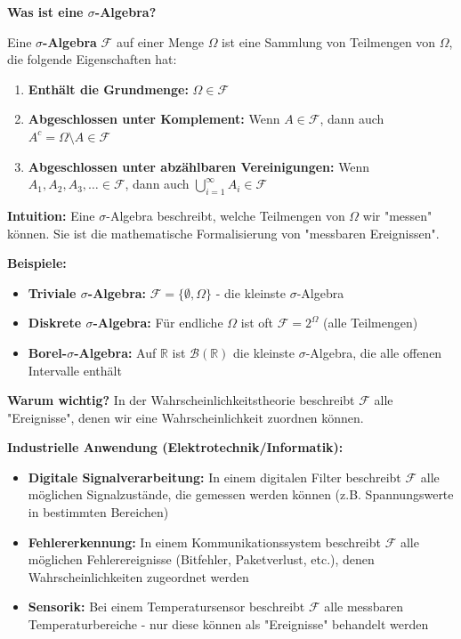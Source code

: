 \begin{denoobification}
\textbf{Was ist eine $\sigma$-Algebra?}

Eine \textbf{$\sigma$-Algebra} $\mathcal{F}$ auf einer Menge $\Omega$ ist eine Sammlung von Teilmengen von $\Omega$, die folgende Eigenschaften hat:

\begin{enumerate}
    \item \textbf{Enthält die Grundmenge:} $\Omega \in \mathcal{F}$
    \item \textbf{Abgeschlossen unter Komplement:} Wenn $A \in \mathcal{F}$, dann auch $A^c = \Omega \setminus A \in \mathcal{F}$
    \item \textbf{Abgeschlossen unter abzählbaren Vereinigungen:} Wenn $A_1, A_2, A_3, \ldots \in \mathcal{F}$, dann auch $\bigcup_{i=1}^{\infty} A_i \in \mathcal{F}$
\end{enumerate}

\textbf{Intuition:} Eine $\sigma$-Algebra beschreibt, welche Teilmengen von $\Omega$ wir "messen" können. Sie ist die mathematische Formalisierung von "messbaren Ereignissen".

\textbf{Beispiele:}
\begin{itemize}
    \item \textbf{Triviale $\sigma$-Algebra:} $\mathcal{F} = \{\emptyset, \Omega\}$ - die kleinste $\sigma$-Algebra
    \item \textbf{Diskrete $\sigma$-Algebra:} Für endliche $\Omega$ ist oft $\mathcal{F} = 2^{\Omega}$ (alle Teilmengen)
    \item \textbf{Borel-$\sigma$-Algebra:} Auf $\mathbb{R}$ ist $\mathcal{B}(\mathbb{R})$ die kleinste $\sigma$-Algebra, die alle offenen Intervalle enthält
\end{itemize}

\textbf{Warum wichtig?} In der Wahrscheinlichkeitstheorie beschreibt $\mathcal{F}$ alle "Ereignisse", denen wir eine Wahrscheinlichkeit zuordnen können.

\textbf{Industrielle Anwendung (Elektrotechnik/Informatik):}
\begin{itemize}
    \item \textbf{Digitale Signalverarbeitung:} In einem digitalen Filter beschreibt $\mathcal{F}$ alle möglichen Signalzustände, die gemessen werden können (z.B. Spannungswerte in bestimmten Bereichen)
    \item \textbf{Fehlererkennung:} In einem Kommunikationssystem beschreibt $\mathcal{F}$ alle möglichen Fehlerereignisse (Bitfehler, Paketverlust, etc.), denen Wahrscheinlichkeiten zugeordnet werden
    \item \textbf{Sensorik:} Bei einem Temperatursensor beschreibt $\mathcal{F}$ alle messbaren Temperaturbereiche - nur diese können als "Ereignisse" behandelt werden
\end{itemize}


\end{denoobification}
